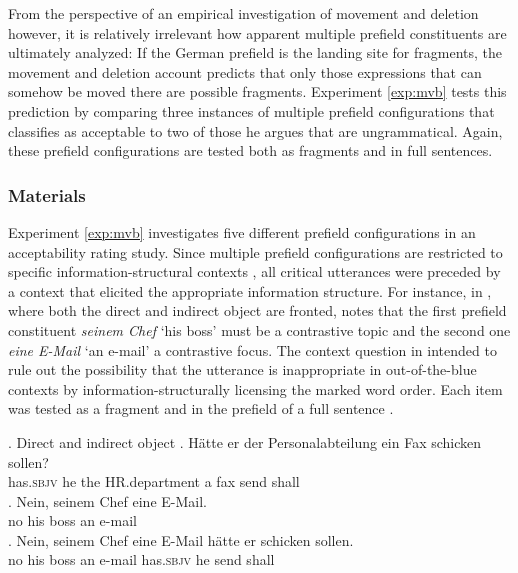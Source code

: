 From the perspective of an empirical investigation of movement and deletion however, it is relatively irrelevant how apparent multiple prefield constituents are ultimately analyzed: If the German prefield is the landing site for fragments, the movement and deletion account predicts that only those expressions that can somehow be moved there are possible fragments. Experiment \ref{exp:mvb} tests this prediction by comparing three instances of multiple prefield configurations that \citet{muller2003} classifies as acceptable to two of those he argues that are ungrammatical. Again, these prefield configurations are tested both as fragments and in full sentences.

\subsubsection{Materials}\label{sec:mvb-method}

Experiment \ref{exp:mvb} investigates five different prefield configurations in an acceptability rating study. Since multiple prefield configurations are restricted to specific information-structural contexts \citep{muller2005, bildhauer2011}, all critical utterances were preceded by a context that elicited the appropriate information structure. For instance, in  \Next, where both the direct and indirect object are fronted, \citet[59]{muller2003} notes that the first prefield constituent \textit{seinem Chef} `his boss' must be a contrastive topic \citep{buring1997} and the second one \textit{eine E-Mail} `an e-mail' a contrastive focus. 
The context question in \Next[a] intended to rule out the possibility that the utterance is inappropriate in out-of-the-blue contexts by information-structurally licensing the marked word order. Each item was tested as a fragment \Next[b] and in the prefield of a full sentence \Next[c].

\ex. Direct and indirect object \label{ex:mvb-item-doio}
\ag. Hätte  er  der Personalabteilung ein Fax schicken sollen?\\
has.\textsc{sbjv} he the HR.department a fax send shall\\
\bg. Nein, seinem Chef eine E-Mail.\\
    no  his  boss an  e-mail\\
\cg. Nein, seinem Chef eine E-Mail hätte er schicken sollen.\\
	no his boss an  e-mail   has.\textsc{sbjv} he send shall\\


